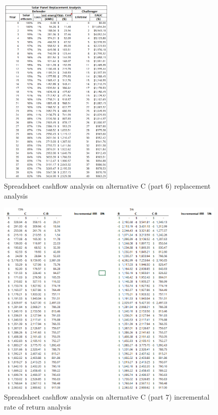 \documentclass[10pt,letterpaper]{article}
\begin{document}
\begin{figure}[H]
	\centering
	\includegraphics[width=0.5\textwidth]{assets/1534571099518}
	\caption{Spreadsheet cashflow analysis on alternative C (part 6) replacement analysis}
\end{figure}

\begin{figure}[H]
	\centering
	\includegraphics[width=1.0\textwidth]{assets/1534571197467}
	\caption{Spreadsheet cashflow analysis on alternative C (part 7) incremental rate of return analysis}
\end{figure}
\end{document}
